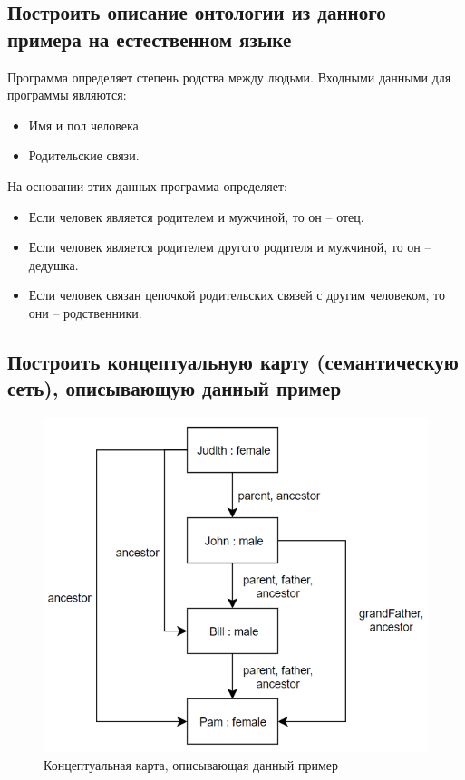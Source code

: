 \documentclass[14pt,a4paper,report]{report}
\begin{document}
\subsection{Построить описание онтологии из данного примера на естественном языке}

Программа определяет степень родства между людьми. Входными данными для программы являются:

\begin{itemize}
	\item Имя и пол человека.
	\item Родительские связи.
\end{itemize}

На основании этих данных программа определяет:

\begin{itemize}
	\item Если человек является родителем и мужчиной, то он -- отец.
	\item Если человек является родителем другого родителя и мужчиной, то он -- дедушка.
	\item Если человек связан цепочкой родительских связей с другим человеком, то они -- родственники.
\end{itemize}

\subsection{Построить концептуальную карту (семантическую сеть), описывающую данный пример}

\begin{figure}[h!]
	\centering
	\includegraphics[scale = 0.6]{images/3.png}
	\caption{Концептуальная карта, описывающая данный пример}
\end{figure}
\end{document}
